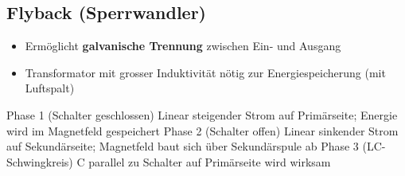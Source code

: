 \subsection{Flyback (Sperrwandler)}

\begin{minipage}[c]{0.4\columnwidth}
    
\end{minipage}
\hfill
\begin{minipage}[c]{0.58\columnwidth}
    \begin{itemize}
        \item Ermöglicht \textbf{galvanische Trennung} zwischen Ein- und Ausgang
        \item Transformator mit grosser Induktivität nötig zur Energiespeicherung (mit Luftspalt)
    \end{itemize}
\end{minipage}


\begin{outline}
    \1 Phase 1 (Schalter geschlossen)
        \2 Linear steigender Strom auf Primärseite; Energie wird im Magnetfeld gespeichert
    \1 Phase 2 (Schalter offen)
        \2 Linear sinkender Strom auf Sekundärseite; Magnetfeld baut sich über Sekundärspule ab
    \1 Phase 3 (LC-Schwingkreis)
        \2C parallel zu Schalter auf Primärseite wird wirksam 
\end{outline}
